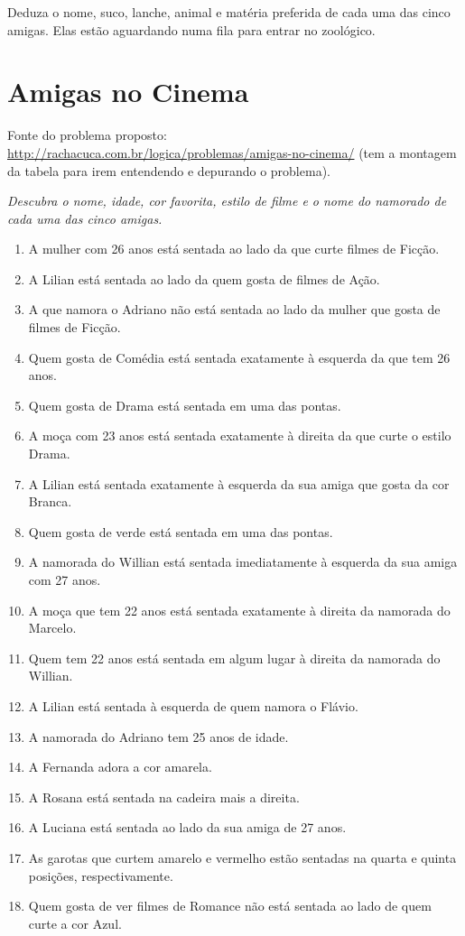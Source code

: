 \documentclass[a4paper,12pt]{article}
\begin{document}
{{\begin{enumerate}
\end{enumerate}

Deduza o nome, suco, lanche, animal e matéria preferida de cada uma das cinco amigas. Elas estão aguardando numa fila para entrar no zoológico.


\newpage
\section{Amigas no Cinema}

 Fonte do problema proposto:\\
 \url{http://rachacuca.com.br/logica/problemas/amigas-no-cinema/}
 (tem a montagem da tabela para irem entendendo e depurando o problema).\\

{\em 
Descubra o nome, idade, cor favorita, estilo de filme e o nome do namorado de cada uma das cinco amigas.
\begin{enumerate}
\item   A mulher com 26 anos está sentada ao lado da que curte filmes de Ficção.
\item	A Lilian está sentada ao lado da quem gosta de filmes de Ação.
\item	A que namora o Adriano não está sentada ao lado da mulher que gosta de filmes de Ficção.
\item	Quem gosta de Comédia está sentada exatamente à esquerda da que tem 26 anos.
\item	Quem gosta de Drama está sentada em uma das pontas.
\item	A moça com 23 anos está sentada exatamente à direita da que curte o estilo Drama.
\item	A Lilian está sentada exatamente à esquerda da sua amiga que gosta da cor Branca.
\item	Quem gosta de verde está sentada em uma das pontas.
\item	A namorada do Willian está sentada imediatamente à esquerda da sua amiga com 27 anos.
\item	A moça que tem 22 anos está sentada exatamente à direita da namorada do Marcelo.
\item	Quem tem 22 anos está sentada em algum lugar à direita da namorada do Willian.
\item	A Lilian está sentada à esquerda de quem namora o Flávio.
\item	A namorada do Adriano tem 25 anos de idade.
\item	A Fernanda adora a cor amarela.
\item	A Rosana está sentada na cadeira mais a direita.
\item	A Luciana está sentada ao lado da sua amiga de 27 anos.
\item	As garotas que curtem amarelo e vermelho estão sentadas na quarta e quinta posições, respectivamente.
\item	Quem gosta de ver filmes de Romance não está sentada ao lado de quem curte a cor Azul.
   

\end{enumerate}}}}
\end{document}
